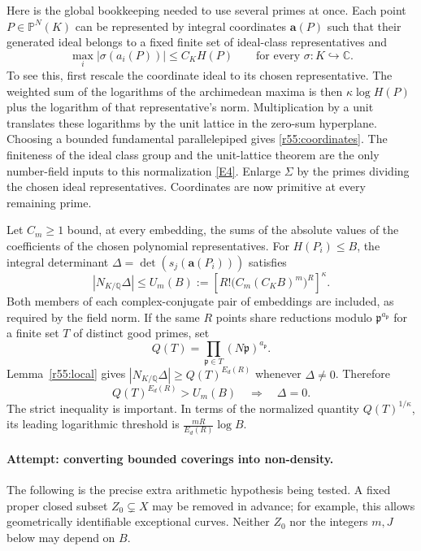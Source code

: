 \documentclass[11pt,a4paper]{article}
\newcommand{\Q}{\mathbb{Q}}
\newcommand{\C}{\mathbb{C}}
\newcommand{\eref}[2]{\hyperlink{extra:#1:#2}{[E#2]}}
\numberwithin{equation}{section}
\begin{document}
Here is the global bookkeeping needed to use several primes at once. Each point $P\in\mathbb P^N(K)$ can be represented by integral coordinates $\mathbf a(P)$ such that their generated ideal belongs to a fixed finite set of ideal-class representatives and
\begin{equation}\label{r55:coordinates}
 \max_i|\sigma(a_i(P))|\leq C_K H(P)
 \qquad\text{for every }\sigma:K\hookrightarrow\C.
\end{equation}
To see this, first rescale the coordinate ideal to its chosen representative. The weighted sum of the logarithms of the archimedean maxima is then $\kappa\log H(P)$ plus the logarithm of that representative's norm. Multiplication by a unit translates these logarithms by the unit lattice in the zero-sum hyperplane. Choosing a bounded fundamental parallelepiped gives \eqref{r55:coordinates}. The finiteness of the ideal class group and the unit-lattice theorem are the only number-field inputs to this normalization \eref{9400081}{4}. Enlarge $\Sigma$ by the primes dividing the chosen ideal representatives. Coordinates are now primitive at every remaining prime.

Let $C_m\geq1$ bound, at every embedding, the sums of the absolute values of the coefficients of the chosen polynomial representatives. For $H(P_i)\leq B$, the integral determinant
$\Delta=\det(s_j(\mathbf a(P_i)))$ satisfies
\begin{equation}\label{r55:normupper}
 |N_{K/\Q}\Delta|
 \leq U_m(B):=\left[R!\bigl(C_m(C_KB)^m\bigr)^R\right]^\kappa.
\end{equation}
Both members of each complex-conjugate pair of embeddings are included, as required by the field norm. If the same $R$ points share reductions modulo $\mathfrak p^{a_{\mathfrak p}}$ for a finite set $T$ of distinct good primes, set
\[
 Q(T)=\prod_{\mathfrak p\in T}(N\mathfrak p)^{a_{\mathfrak p}}.
\]
Lemma~\ref{r55:local} gives $|N_{K/\Q}\Delta|\geq Q(T)^{E_d(R)}$ whenever $\Delta\ne0$. Therefore
\begin{equation}\label{r55:threshold}
 Q(T)^{E_d(R)}>U_m(B)
 \quad\Longrightarrow\quad \Delta=0.
\end{equation}
The strict inequality is important. In terms of the normalized quantity $Q(T)^{1/\kappa}$, its leading logarithmic threshold is $\frac{mR}{E_d(R)}\log B$.

\paragraph{Attempt: converting bounded coverings into non-density.}
The following is the precise extra arithmetic hypothesis being tested. A fixed proper closed subset $Z_0\subsetneq X$ may be removed in advance; for example, this allows geometrically identifiable exceptional curves. Neither $Z_0$ nor the integers $m,J$ below may depend on $B$.
\end{document}
